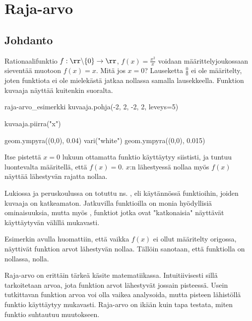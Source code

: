 \chapter{Raja-arvo}

\section{Johdanto}

Rationaalifunktio $f: \rr \backslash \{0 \} \to \rr$, $f(x) = \frac{x^2}{x}$ voidaan määrittelyjoukossaan sieventää muotoon $f(x) = x$. Mitä jos $x = 0$? Lauseketta $\frac{0}{0}$ ei ole määritelty, joten funktiota ei ole mielekästä jatkaa nollassa samalla lausekkeella. Funktion kuvaaja näyttää kuitenkin suoralta.

\begin{luoKuva}{raja-arvo_esimerkki}
	kuvaaja.pohja(-2, 2, -2, 2, leveys=5)

	kuvaaja.piirra("x")
	
	geom.ympyra((0,0), 0.04)
	vari("white")
	geom.ympyra((0,0), 0.015)	
\end{luoKuva}

\begin{center}
\end{center}

Itse pistettä $x = 0$ lukuun ottamatta funktio käyttäytyy siististi, ja tuntuu luontevalta määritellä, että $f(x) = 0$. $x$:n lähestyessä nollaa myös $f(x)$ näyttää lähestyvän rajatta nollaa.

Lukiossa ja peruskoulussa on totuttu ns. , eli käytännössä funktioihin, joiden kuvaaja on katkeamaton. Jatkuvilla funktioilla on monia hyödyllisiä ominaisuuksia, mutta myös , funktiot jotka ovat "katkonaisia" näyttävät käyttäytyvän välillä mukavasti.

Esimerkin avulla huomattiin, että vaikka $f(x)$ ei ollut määritelty origossa, näyttivät funktion arvot lähestyvän nollaa.  Tällöin sanotaan, että funktiolla on  nollassa, nolla.

Raja-arvo on erittäin tärkeä käsite matematiikassa. Intuitiivisesti sillä tarkoitetaan arvoa, jota funktion arvot lähestyvät jossain pisteessä. Usein tutkittavan funktion arvoa voi olla vaikea analysoida, mutta pisteen lähistöllä funktio käyttäytyy mukavasti. Raja-arvo on ikään kuin tapa testata, miten funktio suhtautuu muutokseen.

